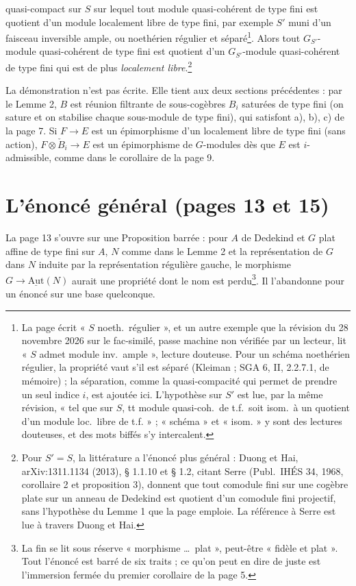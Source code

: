 \documentclass[11pt,a4paper]{article}
\begin{document}
quasi-compact sur $S$ sur lequel tout module quasi-cohérent de type fini
est quotient d'un module localement libre de type fini, par exemple $S'$
muni d'un faisceau inversible ample, ou noethérien régulier et
séparé\footnote{La page écrit « $S$ noeth.\ régulier », et un autre
exemple que la révision du 28 novembre 2026 sur le fac-similé, passe machine non vérifiée par un lecteur, lit « $S$ admet module inv.\ ample »,
lecture douteuse. Pour un schéma noethérien régulier, la propriété vaut
s'il est séparé (Kleiman ; SGA 6, II, 2.2.7.1, de mémoire) ; la
séparation, comme la quasi-compacité qui permet de prendre un seul indice
$i$, est ajoutée ici. L'hypothèse sur $S'$ est lue, par la même révision,
« tel que sur $S$, tt module quasi-coh.\ de t.f.\ soit isom.\ à un quotient
d'un module loc.\ libre de t.f. » ; « schéma » et « isom. » y sont des
lectures douteuses, et des mots biffés s'y intercalent.}. Alors tout $G_{S'}$-module quasi-cohérent de type fini est
quotient d'un $G_{S'}$-module quasi-cohérent de type fini qui est de plus
\emph{localement libre}.\footnote{Pour $S' = S$, la littérature a
l'énoncé plus général : Duong et Hai, arXiv:1311.1134 (2013), § 1.1.10 et
§ 1.2, citant Serre (Publ.\ IHÉS 34, 1968, corollaire 2 et proposition 3),
donnent que tout comodule fini sur une cogèbre plate sur un anneau de
Dedekind est quotient d'un comodule fini projectif, sans l'hypothèse du
Lemme 1 que la page emploie. La référence à Serre est lue à travers Duong et
Hai.}

La démonstration n'est pas écrite. Elle tient aux deux sections
précédentes : par le Lemme 2, $B$ est réunion filtrante de sous-cogèbres
$B_i$ saturées de type fini (on sature et on stabilise chaque sous-module
de type fini), qui satisfont a), b), c) de la page 7. Si $F \to E$ est un
épimorphisme d'un localement libre de type fini (sans action), $F \otimes
\check{B}_i \to E$ est un épimorphisme de $G$-modules dès que $E$ est
$i$-admissible, comme dans le corollaire de la page 9.

\section*{L'énoncé général (pages 13 et 15)}

La page 13 s'ouvre sur une Proposition barrée : pour $A$ de Dedekind et $G$
plat affine de type fini sur $A$, $N$ comme dans le Lemme 2 et la
représentation de $G$ dans $N$ induite par la représentation régulière
gauche, le morphisme $G \to \underline{\mathrm{Aut}}(N)$ aurait une
propriété dont le nom est perdu\footnote{La fin se lit sous réserve
« morphisme \ldots\ plat », peut-être « fidèle et plat ». Tout l'énoncé est
barré de six traits ; ce qu'on peut en dire de juste est l'immersion fermée
du premier corollaire de la page 5.}. Il l'abandonne pour un énoncé sur une
base quelconque.
\end{document}

